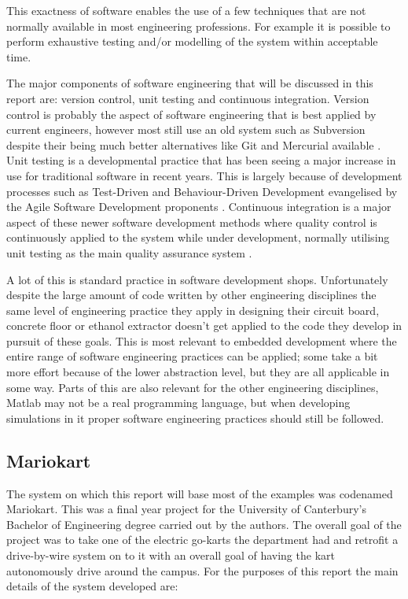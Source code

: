     This exactness of software enables the use of a few techniques that are not
    normally available in most engineering professions.  For example it is
    possible to perform exhaustive testing and/or modelling of the system within
    acceptable time.

    The major components of software engineering that will be discussed in this
    report are: version control, unit testing and continuous integration.
    Version control is probably the aspect of software engineering that is best
    applied by current engineers, however most still use an old system such as
    Subversion despite their being much better alternatives like Git and
    Mercurial available
    \cite{Glassy:2006:UVC:1089182.1089195,Gurbani:2005:CSO:1083258.1083264}.
    Unit testing is a developmental practice that has been seeing a major
    increase in use for traditional software in recent years.  This is largely
    because of development processes such as Test-Driven and Behaviour-Driven
    Development evangelised by the Agile Software Development proponents
    \cite{Muller:2001:CSE:381473.381536}.  Continuous integration is a major
    aspect of these newer software development methods where quality control is
    continuously applied to the system while under development, normally
    utilising unit testing as the main quality assurance system \cite{Holck}.

    A lot of this is standard practice in software development shops.
    Unfortunately despite the large amount of code written by other engineering
    disciplines the same level of engineering practice they apply in designing
    their circuit board, concrete floor or ethanol extractor doesn't get applied
    to the code they develop in pursuit of these goals.  This is most relevant
    to embedded development where the entire range of software engineering
    practices can be applied; some take a bit more effort because of the lower
    abstraction level, but they are all applicable in some way.  Parts of this
    are also relevant for the other engineering disciplines, Matlab may not be a
    real programming language, but when developing simulations in it proper
    software engineering practices should still be followed.

  \subsection{Mariokart}

    The system on which this report will base most of the examples was codenamed
    Mariokart.  This was a final year project for the University of Canterbury's
    Bachelor of Engineering degree carried out by the authors.  The overall goal
    of the project was to take one of the electric go-karts the department had
    and retrofit a drive-by-wire system on to it with an overall goal of having
    the kart autonomously drive around the campus.  For the purposes of this
    report the main details of the system developed are:

